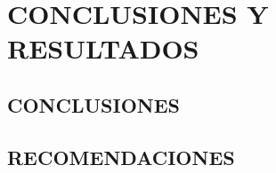 \newpage
\chapter{CONCLUSIONES Y RESULTADOS}

        \section{CONCLUSIONES}
        \section{RECOMENDACIONES}